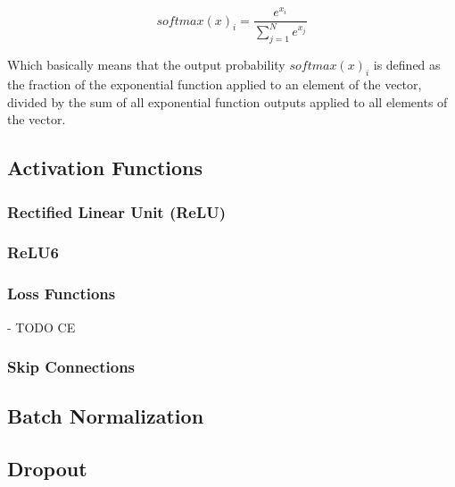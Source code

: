 \begin{equation}
    softmax(x)_i = \frac{e^{x_i}}{\sum_{j=1}^Ne^{x_j}}
\end{equation}

Which basically means that the output probability $softmax(x)_i$ is defined as the fraction of the exponential function applied to an element of the vector, divided by the sum of all exponential function outputs applied to all elements of the vector.

\subsection{Activation Functions}

\subsubsection{Rectified Linear Unit (ReLU)}

\subsubsection{ReLU6}

\subsubsection{Loss Functions}

- TODO CE

\subsubsection{Skip Connections}

\subsection{Batch Normalization}

\subsection{Dropout}

